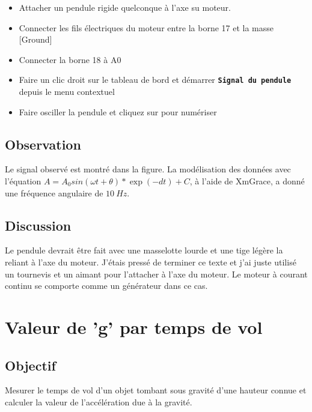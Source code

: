 \documentclass{book}
\newcommand{\nop}{}
\begin{document}
\begin{itemize}
  \item Attacher un pendule rigide quelconque à l'axe su moteur.
  \item Connecter les fils électriques du moteur entre la borne 17 et la masse [Ground]
  \item Connecter la borne 18 à A0
  \item Faire un clic droit sur le tableau de bord et démarrer  \texttt{\textbf{Signal du pendule}\nop} depuis le menu contextuel
  \item Faire osciller la pendule et cliquez sur   pour numériser
\end{itemize}

\subsection{Observation}


Le signal observé est montré dans la figure. La modélisation des données avec l'équation $A=A_{0}sin\left(\omega t+\theta\right)*\exp\left(-dt\right)+C$, à l'aide de XmGrace, a donné une fréquence angulaire de $10\ Hz$.

\subsection{Discussion}


Le pendule devrait être fait avec une masselotte lourde et une tige légère la reliant à l'axe du moteur. J'étais pressé de terminer ce texte et j'ai juste utilisé un tournevis et un aimant pour l'attacher à l'axe du moteur. Le moteur à courant continu se comporte comme un générateur dans ce cas.







\section{Valeur de 'g' par temps de vol}



\subsection{Objectif}


Mesurer le temps de vol d'un objet tombant sous gravité d'une hauteur connue et calculer la valeur de l'accélération due à la gravité.
\end{document}
